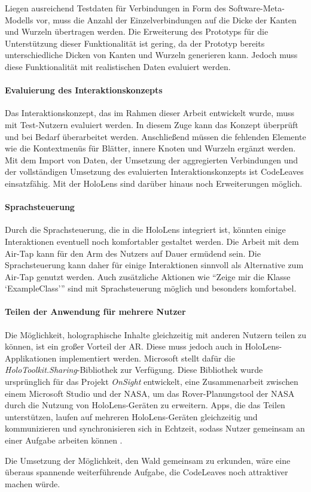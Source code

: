 Liegen ausreichend Testdaten für Verbindungen in Form des Software-Meta-Modells vor, muss die Anzahl der Einzelverbindungen auf die Dicke der Kanten und Wurzeln übertragen werden. Die Erweiterung des Prototyps für die Unterstützung dieser Funktionalität ist gering, da der Prototyp bereits unterschiedliche Dicken von Kanten und Wurzeln generieren kann. Jedoch muss diese Funktionalität mit realistischen Daten evaluiert werden.

\paragraph{Evaluierung des Interaktionskonzepts}

Das Interaktionskonzept, das im Rahmen dieser Arbeit entwickelt wurde, muss mit Test-Nutzern evaluiert werden. In diesem Zuge kann das Konzept überprüft und bei Bedarf überarbeitet werden. Anschließend müssen die fehlenden Elemente wie die Kontextmenüs für Blätter, innere Knoten und Wurzeln ergänzt werden.\\

Mit dem Import von Daten, der Umsetzung der aggregierten Verbindungen und der vollständigen Umsetzung des evaluierten Interaktionskonzepts ist CodeLeaves einsatzfähig. Mit der HoloLens sind darüber hinaus noch Erweiterungen möglich.

\paragraph*{Sprachsteuerung}

Durch die Sprachsteuerung, die in die HoloLens integriert ist, könnten einige Interaktionen eventuell noch komfortabler gestaltet werden. Die Arbeit mit dem Air-Tap kann für den Arm des Nutzers auf Dauer ermüdend sein. Die Sprachsteuerung kann daher für einige Interaktionen sinnvoll als Alternative zum Air-Tap genutzt werden. Auch zusätzliche Aktionen wie "`Zeige mir die Klasse \enquote*{ExampleClass}"' sind mit Sprachsteuerung möglich und besonders komfortabel.

\paragraph*{Teilen der Anwendung für mehrere Nutzer}
Die Möglichkeit, holographische Inhalte gleichzeitig mit anderen Nutzern teilen zu können, ist ein großer Vorteil der AR. Diese muss jedoch auch in HoloLens-Applikationen implementiert werden. Microsoft stellt dafür die \textit{HoloToolkit.Sharing}-Bibliothek zur Verfügung. Diese Bibliothek wurde ursprünglich für das Projekt \textit{OnSight} entwickelt, eine Zusammenarbeit zwischen einem Microsoft Studio und der NASA, um das Rover-Planungstool der NASA durch die Nutzung von HoloLens-Geräten zu erweitern. Apps, die das Teilen unterstützen, laufen auf mehreren HoloLens-Geräten gleichzeitig und kommunizieren und synchronisieren sich in Echtzeit, sodass Nutzer gemeinsam an einer Aufgabe arbeiten können \cite{microsoft2017sharing}.

Die Umsetzung der Möglichkeit, den Wald gemeinsam zu erkunden, wäre eine überaus spannende weiterführende Aufgabe, die CodeLeaves noch attraktiver machen würde.\\
